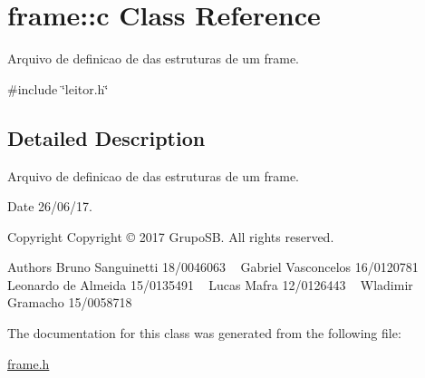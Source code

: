 \hypertarget{classframe_1_1c}{}\section{frame\+:\+:c Class Reference}
\label{classframe_1_1c}


Arquivo de definicao de das estruturas de um frame.  




{\ttfamily \#include \char`\"{}leitor.\+h\char`\"{}}



\subsection{Detailed Description}
Arquivo de definicao de das estruturas de um frame. 

\begin{DoxyDate}{Date}
26/06/17. 
\end{DoxyDate}
\begin{DoxyCopyright}{Copyright}
Copyright © 2017 Grupo\+SB. All rights reserved.
\end{DoxyCopyright}
\begin{DoxyAuthor}{Authors}
Bruno Sanguinetti 18/0046063 ~\newline
Gabriel Vasconcelos 16/0120781 ~\newline
Leonardo de Almeida 15/0135491 ~\newline
Lucas Mafra 12/0126443 ~\newline
Wladimir Gramacho 15/0058718 ~\newline

\end{DoxyAuthor}


The documentation for this class was generated from the following file\+:\begin{DoxyCompactItemize}
\item 
\hyperlink{frame_8h}{frame.\+h}\end{DoxyCompactItemize}
